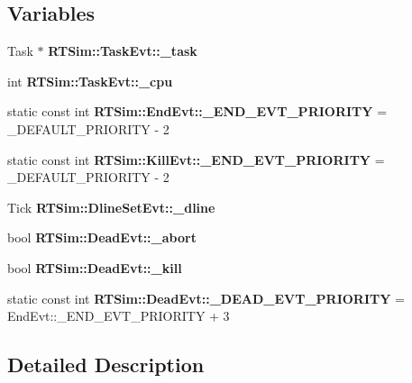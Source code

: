 \subsection*{Variables}
\begin{DoxyCompactItemize}
\item 
Task $\ast$ {\bfseries R\+T\+Sim\+::\+Task\+Evt\+::\+\_\+task}\hypertarget{group__tasks_ga94332c8cabadf28a50f1972c7a180912}{}\label{group__tasks_ga94332c8cabadf28a50f1972c7a180912}

\item 
int {\bfseries R\+T\+Sim\+::\+Task\+Evt\+::\+\_\+cpu}\hypertarget{group__tasks_ga9d2bcfa407d848798fc8acf510268898}{}\label{group__tasks_ga9d2bcfa407d848798fc8acf510268898}

\item 
static const int {\bfseries R\+T\+Sim\+::\+End\+Evt\+::\+\_\+\+E\+N\+D\+\_\+\+E\+V\+T\+\_\+\+P\+R\+I\+O\+R\+I\+TY} = \+\_\+\+D\+E\+F\+A\+U\+L\+T\+\_\+\+P\+R\+I\+O\+R\+I\+TY -\/ 2\hypertarget{group__tasks_ga83dc2cb4f3e61a9a081093400f3c9df7}{}\label{group__tasks_ga83dc2cb4f3e61a9a081093400f3c9df7}

\item 
static const int {\bfseries R\+T\+Sim\+::\+Kill\+Evt\+::\+\_\+\+E\+N\+D\+\_\+\+E\+V\+T\+\_\+\+P\+R\+I\+O\+R\+I\+TY} = \+\_\+\+D\+E\+F\+A\+U\+L\+T\+\_\+\+P\+R\+I\+O\+R\+I\+TY -\/ 2\hypertarget{group__tasks_ga80da1f84fedb61da313dbce3f28b73e5}{}\label{group__tasks_ga80da1f84fedb61da313dbce3f28b73e5}

\item 
Tick {\bfseries R\+T\+Sim\+::\+Dline\+Set\+Evt\+::\+\_\+dline}\hypertarget{group__tasks_ga2ac62aab55a9e1297b55d36408a11160}{}\label{group__tasks_ga2ac62aab55a9e1297b55d36408a11160}

\item 
bool {\bfseries R\+T\+Sim\+::\+Dead\+Evt\+::\+\_\+abort}\hypertarget{group__tasks_gaedfbd8f756ec5d85a7692d8b2f59ff1b}{}\label{group__tasks_gaedfbd8f756ec5d85a7692d8b2f59ff1b}

\item 
bool {\bfseries R\+T\+Sim\+::\+Dead\+Evt\+::\+\_\+kill}\hypertarget{group__tasks_gad5657bdbb973f7b973d67531fdfe6c42}{}\label{group__tasks_gad5657bdbb973f7b973d67531fdfe6c42}

\item 
static const int {\bfseries R\+T\+Sim\+::\+Dead\+Evt\+::\+\_\+\+D\+E\+A\+D\+\_\+\+E\+V\+T\+\_\+\+P\+R\+I\+O\+R\+I\+TY} = End\+Evt\+::\+\_\+\+E\+N\+D\+\_\+\+E\+V\+T\+\_\+\+P\+R\+I\+O\+R\+I\+TY + 3\hypertarget{group__tasks_ga6f9f3a537ad787e00d02bb2a42ef4009}{}\label{group__tasks_ga6f9f3a537ad787e00d02bb2a42ef4009}

\end{DoxyCompactItemize}


\subsection{Detailed Description}
